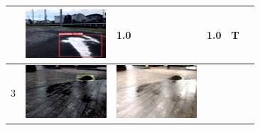 \documentclass[10pt]{jarticle}
\begin{document}
\begin{table}[H]
\begin{tabular}{|l|l|l|l|l|l|}
\begin{minipage}{.1\textwidth}
           \end{minipage}       & \begin{minipage}{.1\textwidth}
            \centering
            \includegraphics[width=0.9\linewidth]{./fig/tab2_r.png}
           \end{minipage}       & 1.0 & 1.0 & T       \\ \hline
        3  & \begin{minipage}{.1\textwidth}
            \centering
            \includegraphics[width=0.9\linewidth]{./fig/tab3_a.png}
           \end{minipage}       & \begin{minipage}{.1\textwidth}
            \centering
            \includegraphics[width=0.9\linewidth]{./fig/tab3_r.png}

\end{minipage}
\end{tabular}
\end{table}
\end{document}
